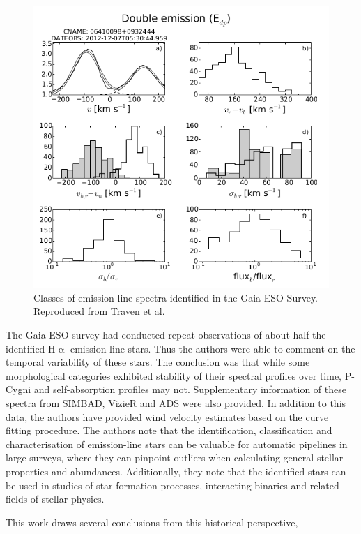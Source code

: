 \begin{figure}[!htb]
\centering
\includegraphics[scale=.50]{figures/gaia eso2.png}
\caption{Classes of emission-line spectra identified in the Gaia-ESO Survey. Reproduced from Traven et al.}
\end{figure}

The Gaia-ESO survey had conducted repeat observations of about half the identified H$\upalpha$ emission-line stars. Thus the authors were able to comment on the temporal variability of these stars. The conclusion was that while some morphological categories exhibited stability of their spectral profiles over time, P-Cygni and self-absorption profiles may not. Supplementary information of these spectra from SIMBAD, VizieR and ADS were also provided. In addition to this data, the authors have provided wind velocity estimates based on the curve fitting procedure. The authors note that the identification, classification and characterisation of emission-line stars can be valuable for automatic pipelines in large surveys, where they can pinpoint outliers when calculating general stellar properties and abundances. Additionally, they note that the identified stars can be used in studies of star formation processes, interacting binaries and related fields of stellar physics. 

This work draws several conclusions from this historical perspective,

